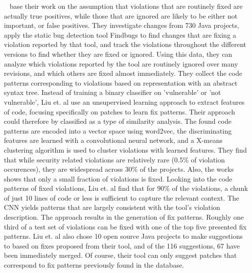 \documentclass[
	a4paper,
	pagesize,
	pdftex,
	12pt,
	twoside, %
	BCOR=5mm, %
	ngerman,
	fleqn,
	final,
	]{scrartcl}
\begin{document}
~\cite{Liu.2018} base their work on the assumption that violations that are routinely fixed are actually true positives, while those that are ignored are likely to be either not important, or false positives. They investigate changes from 730 Java projects, apply the static bug detection tool Findbugs to find changes that are fixing a violation reported by that tool, and track the violations throughout the different versions to find whether they are fixed or ignored. Using this data, they can analyze which violations reported by the tool are routinely ignored over many revisions, and which others are fixed almost immediately. They collect the code patterns corresponding to violations based on representation with an abstract syntax tree. Instead of training a binary classifier on 'vulnerable' or 'not vulnerable', Liu et. al use an unsupervised learning approach to extract features of code, focusing specifically on patches to learn fix patterns. Their approach could therefore by classified as a type of similarity analysis. The found code patterns are encoded into a vector space using word2vec, the discriminating features are learned with a convolutional neural network, and a X-means clustering algorithm is used to cluster violations with learned features. They find that while security related violations are relatively rare (0.5\% of violation occurences), they are widespread across 30\% of the projects. Also, the works shows that only a small fraction of violations is fixed. Looking into the code patterns of fixed violations, Liu et. al find that for 90\% of the violations, a chunk of just 10 lines of code or less is sufficient to capture the relevant context. The CNN yields patterns that are largely consistent with the tool's violation description. The approach results in the generation of fix patterns. Roughly one third of a test set of violations can be fixed with one of the top five presented fix patterns. Liu et. al also chose 10 open source Java projects to make suggestions to based on fixes proposed from their tool, and of the 116 suggestions, 67 have been immediately merged. Of course, their tool can only suggest patches that correspond to fix patterns previously found in the database. \\
\end{document}
